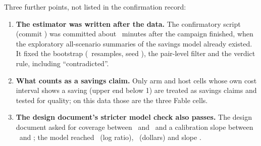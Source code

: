 Three further points, not listed in the confirmation record:
\begin{enumerate}[leftmargin=1.4em,label=(\alph*)]
  \item \textbf{The estimator was written after the data.} The confirmatory script (commit
    \code{\ConfirmSha}) was committed about \ConfirmAfterMin\ minutes after the campaign finished, when the
    exploratory all-scenario summaries of the savings model already existed. It fixed the bootstrap (\Boot\
    resamples, seed \BootSeed), the pair-level filter and the verdict rule, including ``contradicted''.
  \item \textbf{What counts as a savings claim.} Only arm and host cells whose own cost interval shows a saving
    (upper end below 1) are treated as savings claims and tested for quality; on this data those are the three
    Fable cells.
  \item \textbf{The design document's stricter model check also passes.} The design document asked for
    coverage between \DesignCovLow\ and \DesignCovHigh\ and a calibration slope between \DesignSlopeLow\ and
    \DesignSlopeHigh; the model reached \MCCovLog\ (log ratio), \MCCovUSD\ (dollars) and slope \MCSlope.
\end{enumerate}

\FloatBarrier
{\small}
\FloatBarrier

\FloatBarrier
{\small}
\FloatBarrier
